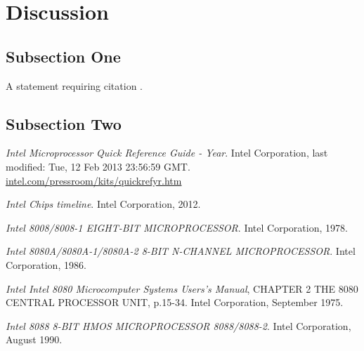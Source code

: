 \documentclass[twoside,twocolumn]{article}
\begin{document}
\blindtext %


\section{Discussion}

\subsection{Subsection One}

A statement requiring citation \cite{Figueredo:2009dg}.
\blindtext %

\subsection{Subsection Two}

\blindtext %


\begin{thebibliography}{99} %

\textit{Intel Microprocessor Quick Reference Guide - Year}.
Intel Corporation, last modified: Tue, 12 Feb 2013 23:56:59 GMT.
\href{https://www.intel.com/pressroom/kits/quickrefyr.htm}{intel.com/pressroom/kits/quickrefyr.htm}

\textit{Intel Chips timeline}.
Intel Corporation, 2012.

\textit{Intel 8008/8008-1 EIGHT-BIT MICROPROCESSOR}.
Intel Corporation, 1978.

\textit{Intel 8080A/8080A-1/8080A-2 8-BIT N-CHANNEL MICROPROCESSOR}.
Intel Corporation, 1986.

\textit{Intel Intel 8080 Microcomputer Systems Users's Manual}, CHAPTER 2 THE 8080 CENTRAL PROCESSOR UNIT, p.15-34.
Intel Corporation, September 1975.

\textit{Intel 8088 8-BIT HMOS MICROPROCESSOR 8088/8088-2}.
Intel Corporation, August 1990.

\end{thebibliography}

\end{document}
